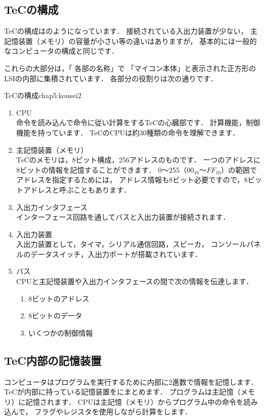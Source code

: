 \newpage
\subsection{TeCの構成}

TeCの構成はのようになっています．
接続されている入出力装置が少ない，
主記憶装置（メモリ）の容量が小さい等の違いはありますが，
基本的には一般的なコンピュータの構成と同じです．

これらの大部分は，「 各部の名称」で
「マイコン本体」と表示された正方形のLSIの内部に集積されています．
各部分の役割りは次の通りです．

          {TeCの構成}{chap5:kousei2}

\begin{enumerate}
\item CPU \\
  命令を読み込んで命令に従い計算をするTeCの心臓部です．
  計算機能，制御機能を持っています．
  TeCのCPUは約30種類の命令を理解できます．
\item 主記憶装置（メモリ） \\
  TeCのメモリは，8ビット構成，256アドレスのものです．
  一つのアドレスに8ビットの情報を記憶することができます．
  0〜255（$00_{16}$〜$FF_{16}$）の範囲でアドレスを指定するためには，
  アドレス情報も8ビット必要ですので，8ビットアドレスと呼ぶこともあります．
\item 入出力インタフェース \\
  インターフェース回路を通してバスと入出力装置が接続されます．
\item 入出力装置 \\
  入出力装置として，タイマ，シリアル通信回路，スピーカ，
  コンソールパネルのデータスイッチ，入出力ポートが搭載されています．
\item バス \\
  CPUと主記憶装置や入出力インタフェースの間で次の情報を伝達します．
  \begin{enumerate}
  \item 8ビットのアドレス
  \item 8ビットのデータ
  \item いくつかの制御情報
  \end{enumerate}
\end{enumerate}

\subsection{TeC内部の記憶装置}
コンピュータはプログラムを実行するために内部に2進数で情報を記憶します．
TeCが内部に持っている記憶装置をにまとめます．
プログラムは主記憶（メモリ）に記憶されます．
CPUは主記憶（メモリ）からプログラム中の命令を読み込んで，
フラグやレジスタを使用しながら計算をします．

